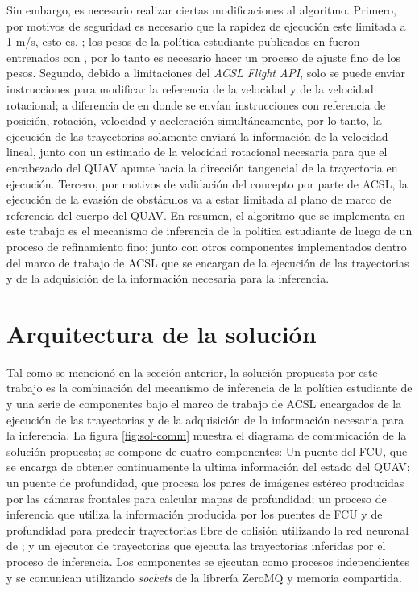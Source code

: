 Sin embargo, es necesario realizar ciertas modificaciones al algoritmo. Primero, por motivos de seguridad es necesario que la rapidez de ejecución este limitada a 1 m/s, esto es, ; los pesos de la política estudiante publicados en \cite{Loquercio2021} fueron entrenados con , por lo tanto es necesario hacer un proceso de ajuste fino de los pesos. Segundo, debido a limitaciones del \textit{ACSL Flight API}, solo se puede enviar instrucciones para modificar la referencia de la velocidad y de la velocidad rotacional; a diferencia de \cite{Loquercio2021} en donde se envían instrucciones con referencia de posición, rotación, velocidad y aceleración simultáneamente, por lo tanto, la ejecución de las trayectorias solamente enviará la información de la velocidad lineal, junto con un estimado de la velocidad rotacional necesaria para que el encabezado del QUAV apunte hacia la dirección tangencial de la trayectoria en ejecución. Tercero, por motivos de validación del concepto por parte de ACSL, la ejecución de la evasión de obstáculos va a estar limitada al plano  de marco de referencia del cuerpo del QUAV. En resumen, el algoritmo que se implementa en este trabajo es el mecanismo de inferencia de la política estudiante de \cite{Loquercio2021} luego de un proceso de refinamiento fino; junto con otros componentes implementados dentro del marco de trabajo de ACSL que se encargan de la ejecución de las trayectorias y de la adquisición de la información necesaria para la inferencia.

\section{Arquitectura de la solución}

\label{sec:imp-arch}

Tal como se mencionó en la sección anterior, la solución propuesta por este trabajo es la combinación del mecanismo de inferencia de la política estudiante de \cite{Loquercio2021} y una serie de componentes bajo el marco de trabajo de ACSL encargados de la ejecución de las trayectorias y de la adquisición de la información necesaria para la inferencia. La figura \ref{fig:sol-comm} muestra el diagrama de comunicación de la solución propuesta; se compone de cuatro componentes: Un puente del FCU, que se encarga de obtener continuamente la ultima información del estado del QUAV; un puente de profundidad, que procesa los pares de imágenes estéreo producidas por las cámaras frontales para calcular mapas de profundidad; un proceso de inferencia que utiliza la información producida por los puentes de FCU y de profundidad para predecir trayectorias libre de colisión utilizando la red neuronal de \cite{Loquercio2021}; y un ejecutor de trayectorias que ejecuta las trayectorias inferidas por el proceso de inferencia. Los componentes se ejecutan como procesos independientes y se comunican utilizando  \textit{sockets} de la librería ZeroMQ \cite{zeroMQ} y memoria compartida.

